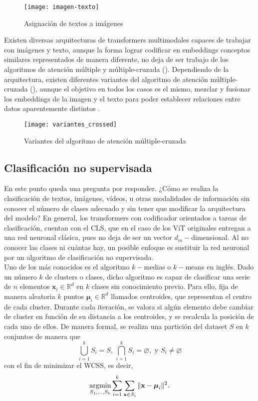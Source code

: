 			\begin{figure}[!h]
				\centering
				\texttt{[image: imagen-texto]}
				\caption{Asignación de textos a imágenes}
				\label{fig:textos_imagenes}
			\end{figure}
			
			Existen diversas arquitecturas de transformers multimodales capaces de trabajar con imágenes y texto, aunque la forma lograr codificar en embeddings conceptos similares representados de manera diferente, no deja de ser trabajo de los algoritmos de atención múltiple y múltiple-cruzada (). Dependiendo de la arquitectura, existen diferentes variantes del algoritmo de atención múltiple-cruzada (), aunque el objetivo en todos los casos es el mismo, mezclar y fusionar los embeddings de la imagen y el texto para poder establecer relaciones entre datos aparentemente distintos \cite{multimodal_transformers}. 
			
			\begin{figure}[!h]
				\centering
				\texttt{[image: variantes\_crossed]}
				\caption{Variantes del algoritmo de atención múltiple-cruzada}
				\label{fig:variantes_crossed}
			\end{figure}
			
			\subsection{Clasificación no supervisada}
			
				En este punto queda una pregunta por responder. ¿Cómo se realiza la clasificación de textos, imágenes, vídeos, u otras modalidades de información sin conocer el número de clases adecuado y sin tener que modificar la arquitectura del modelo? En general, los transformers con codificador orientados a tareas de clasificación, cuentan con el CLS, que en el caso de los ViT originales entregan a una red neuronal clásica, pues no deja de ser un vector $d_m-$dimensional. Al no conocer las clases ni cuántas hay, un posible enfoque es sustituir la red neuronal por un algoritmo de clasificación no supervisada. \\
				
				Uno de los más conocidos es el algoritmo $k-$medias \cite{kmeans} o $k-$means en inglés. Dado un número $k$ de clusters o clases, dicho algoritmo es capaz de clasificar una serie de $n$ elementos $\textbf{x}_i \in \mathbb{R}^d$ en $k$ clases sin conocimiento previo. Para ello, fija de manera aleatoria $k$ puntos $\boldsymbol{\mu}_i \in \mathbb{R}^d$ llamados centroides, que representan el centro de cada cluster. Durante cada iteración, se valora si algún elemento debe cambiar de cluster en función de su distancia a los centroides, y se recalcula la posición de cada uno de ellos. De manera formal, se realiza una partición del dataset $S$ en $k$ conjuntos de manera que 
				$$
				\bigcup_{i = 1}^k S_i = S, \, \bigcap_{i = 1}^k S_i = \varnothing, \text{ y } S_i \neq \varnothing
				$$
				con el fin de minimizar el WCSS, es decir, 
				$$
				\operatorname*{\arg\!\min}_{S_1, \ldots, S_k}\sum_{i = 1}^k\sum_{\textbf{x}\in S_i}\|\textbf{x}-\boldsymbol{\mu}_i\|^2. 
				$$ 
				
